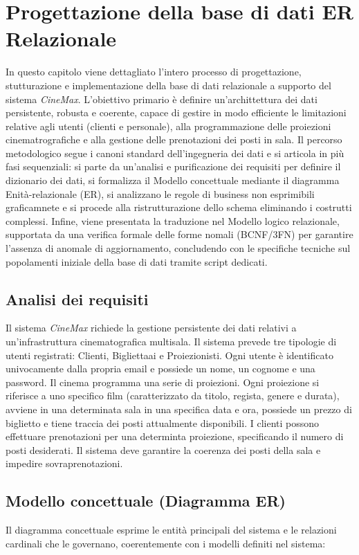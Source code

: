 \documentclass{article}
\begin{document}
\section{Progettazione della base di dati ER Relazionale} 
In questo capitolo viene dettagliato l'intero processo di progettazione, stutturazione e implementazione della base di dati relazionale a supporto del sistema \textit{CineMax}. L'obiettivo primario è definire un'archittettura dei dati persistente, robusta e coerente, capace di gestire in modo efficiente le limitazioni relative agli utenti (clienti e personale), alla programmazione delle proiezioni cinematrografiche e alla gestione delle prenotazioni dei posti in sala. 
Il percorso metodologico segue i canoni standard dell'ingegneria dei dati e si articola in più fasi sequenziali: si parte da un'analisi e purificazione dei requisiti per definire il dizionario dei dati, si formalizza il Modello concettuale mediante il diagramma Enità-relazionale (ER), si analizzano le regole di business non esprimibili graficamnete e si procede alla ristrutturazione dello schema eliminando i costrutti complessi. Infine, viene presentata la traduzione nel Modello logico relazionale, supportata da una verifica formale  delle forme nomali (BCNF/3FN) per garantire l'assenza di anomale di aggiornamento, concludendo con le specifiche tecniche sul popolamenti iniziale della base di dati tramite script dedicati.
\subsection{Analisi dei requisiti}
Il sistema \textit{CineMax} richiede la gestione persistente dei dati relativi a un'infrastruttura cinematografica multisala. Il sistema prevede tre tipologie di utenti registrati: Clienti, Bigliettaai e Proiezionisti. 
Ogni utente è identificato univocamente dalla propria email e possiede un nome, un cognome e una password. Il cinema programma una serie di proiezioni. Ogni proiezione si riferisce a uno specifico film (caratterizzato da titolo, regista, genere e durata), avviene in una determinata sala in una specifica data e ora, possiede un prezzo di biglietto e tiene traccia dei posti attualmente disponibili.
I clienti possono effettuare prenotazioni per una determinta proiezione, specificando il numero di posti desiderati. Il sistema deve garantire la coerenza dei posti della sala e impedire sovraprenotazioni.


\subsection{Modello concettuale (Diagramma ER)}
Il diagramma concettuale esprime le entità principali del sistema e le relazioni cardinali che le governano, coerentemente con i modelli definiti nel sistema:
\end{document}
